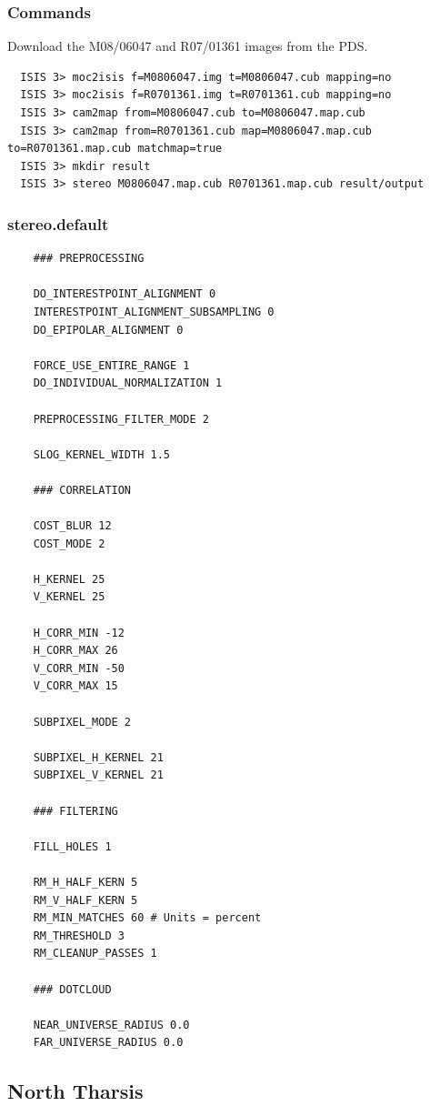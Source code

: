 \subsubsection*{Commands}

Download the M08/06047 and R07/01361 images from the \ac{PDS}.
\begin{verbatim}
  ISIS 3> moc2isis f=M0806047.img t=M0806047.cub mapping=no
  ISIS 3> moc2isis f=R0701361.img t=R0701361.cub mapping=no
  ISIS 3> cam2map from=M0806047.cub to=M0806047.map.cub
  ISIS 3> cam2map from=R0701361.cub map=M0806047.map.cub to=R0701361.map.cub matchmap=true
  ISIS 3> mkdir result
  ISIS 3> stereo M0806047.map.cub R0701361.map.cub result/output
\end{verbatim}

\subsubsection*{stereo.default}

\begin{verbatim}
    ### PREPROCESSING

    DO_INTERESTPOINT_ALIGNMENT 0
    INTERESTPOINT_ALIGNMENT_SUBSAMPLING 0
    DO_EPIPOLAR_ALIGNMENT 0

    FORCE_USE_ENTIRE_RANGE 1
    DO_INDIVIDUAL_NORMALIZATION 1

    PREPROCESSING_FILTER_MODE 2

    SLOG_KERNEL_WIDTH 1.5

    ### CORRELATION

    COST_BLUR 12
    COST_MODE 2

    H_KERNEL 25
    V_KERNEL 25

    H_CORR_MIN -12
    H_CORR_MAX 26
    V_CORR_MIN -50
    V_CORR_MAX 15

    SUBPIXEL_MODE 2

    SUBPIXEL_H_KERNEL 21
    SUBPIXEL_V_KERNEL 21

    ### FILTERING

    FILL_HOLES 1

    RM_H_HALF_KERN 5
    RM_V_HALF_KERN 5
    RM_MIN_MATCHES 60 # Units = percent
    RM_THRESHOLD 3
    RM_CLEANUP_PASSES 1

    ### DOTCLOUD

    NEAR_UNIVERSE_RADIUS 0.0
    FAR_UNIVERSE_RADIUS 0.0
\end{verbatim}

\subsection{North Tharsis}


